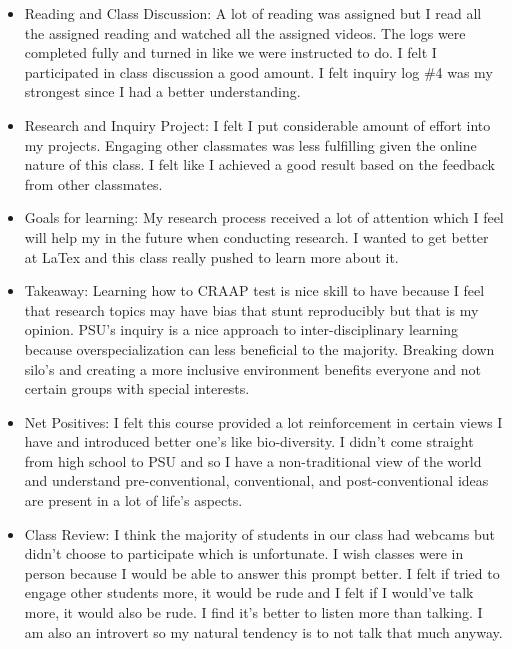 \documentclass{article}
\begin{document}
\begin{enumerate}
\begin{itemize}
        \item Reading and Class Discussion: A lot of reading was assigned but I read all the assigned reading and watched all the assigned videos. The logs were completed fully and turned in like we were instructed to do. I felt I participated in class discussion a good amount. I felt inquiry log \#4 was my strongest since I had a better understanding.

        \item Research and Inquiry Project: I felt I put considerable amount of effort into my projects. Engaging other classmates was less fulfilling given the online nature of this class. I felt like I achieved a good result based on the feedback from other classmates. 

        \item Goals for learning: My research process received a lot of attention which I feel will help my in the future when conducting research. I wanted to get better at LaTex and this class really pushed to learn more about it.

        \item Takeaway: Learning how to CRAAP test is nice skill to have because I feel that research topics may have bias that stunt reproducibly but that is my opinion. PSU's inquiry is a nice approach to inter-disciplinary learning because overspecialization can less beneficial to the majority. Breaking down silo's and creating a more inclusive environment benefits everyone and not certain groups with special interests.

        \item Net Positives: I felt this course provided a lot reinforcement in certain views I have and introduced better one's like bio-diversity. I didn't come straight from high school to PSU and so I have a non-traditional view of the world and understand pre-conventional, conventional, and post-conventional ideas are present in a lot of life's aspects. 

        \item Class Review: I think the majority of students in our class had webcams but didn't choose to participate which is unfortunate. I wish classes were in person because I would be able to answer this prompt better. I felt if tried to engage other students more, it would be rude and I felt if I would've talk more, it would also be rude. I find it's better to listen more than talking. I am also an introvert so my natural tendency is to not talk that much anyway.


\end{itemize}
\end{enumerate}
\end{document}
